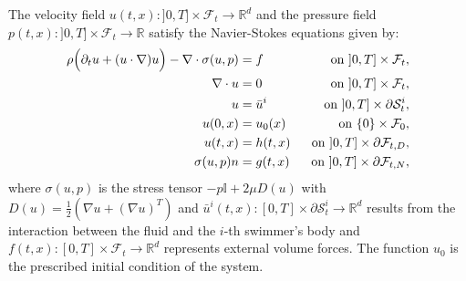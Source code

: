 \documentclass[graybox]{svmult}
\newcommand{\Fluid}{\mathcal{F}} %
\newcommand{\Vel}{u} %
\newcommand{\Pres}{p} %
\newcommand{\Viscosity}{\mu} %
\newcommand{\Solid}{\mathcal{S}} %
\newcommand{\normal}{n} %
\newcommand{\CompDomain}{\Fluid}
\newcommand{\R}{\mathbb{R}}
\begin{document}
The velocity field $\Vel(t,x):]0,T]\times \CompDomain_t \rightarrow \R^d$ and the pressure field $\Pres(t,x):]0,T]\times\CompDomain_t \rightarrow \R$ satisfy the Navier-Stokes equations given by: 
\begin{equation}
	\begin{aligned}
		\rho\Big(\partial_t \Vel +( \Vel \cdot \nabla )\Vel \Big) - \nabla \cdot \sigma(u,p) &= f%
		\quad &\text{on $ ]0,T]\times \CompDomain_t$},
		\\
		\nabla \cdot \Vel &= 0  \quad&\text{on $ ]0,T]\times \CompDomain_t$},\\
		\Vel &= \bar{\Vel}^i%
		\quad &\text{on $]0,T]\times \partial \Solid_t^i$},\\
		\Vel(0,x) &= \Vel_0(x) \quad &\text{on $ \{0\}\times\CompDomain_0$},\\
		\Vel(t,x) &= h(t,x) &\text{on $ ]0,T]\times\partial\CompDomain_{t,D}$},\\
		\sigma(u,p) \normal&= g(t,x) &\text{on $ ]0,T]\times\partial\CompDomain_{t,N}$},
	\end{aligned}
	\label{Eq:NS}
\end{equation}
where $\sigma(u,p)$ is the stress tensor $-\Pres\mathbb{I} + 2 \mu D(u)$ with $D(u) = \frac{1}{2}\left(\nabla u + (\nabla u)^T\right)$ and $\bar{\Vel}^i(t,x):[0,T]\times\partial \Solid_t^i \rightarrow \R^d$ results from the interaction between the fluid and the $i$-th swimmer's body and $f(t,x):[0,T]\times\CompDomain_t \rightarrow \R^d$ represents external volume forces. The function $u_0$ is the prescribed initial condition of the system. 
\end{document}
